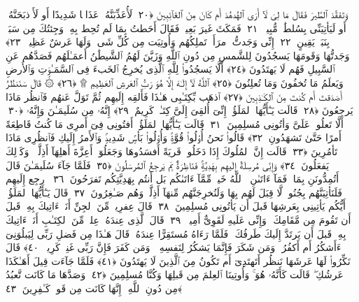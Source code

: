  وَتَفَقَّدَ ٱلطَّيرَ فَقَالَ مَا لِىَ لَآ أَرَى ٱلهُدهُدَ أَم كَانَ مِنَ ٱلغَآئِبِينَ ﴿٢٠﴾
 لَأُعَذِّبَنَّهُۥ عَذَابًۭا شَدِيدًا أَو لَأَا۟ذبَحَنَّهُۥٓ أَو لَيَأتِيَنِّى بِسُلطَٰنٍۢ مُّبِينٍۢ ﴿٢١﴾
 فَمَكَثَ غَيرَ بَعِيدٍۢ فَقَالَ أَحَطتُ بِمَا لَم تُحِط بِهِۦ وَجِئتُكَ مِن سَبَإٍۭ بِنَبَإٍۢ يَقِينٍ ﴿٢٢﴾
 إِنِّى وَجَدتُّ ٱمرَأَةًۭ تَملِكُهُم وَأُوتِيَت مِن كُلِّ شَىءٍۢ وَلَهَا عَرشٌ عَظِيمٌۭ ﴿٢٣﴾
 وَجَدتُّهَا وَقَومَهَا يَسجُدُونَ لِلشَّمسِ مِن دُونِ ٱللَّهِ وَزَيَّنَ لَهُمُ ٱلشَّيطَٰنُ أَعمَـٰلَهُم فَصَدَّهُم عَنِ ٱلسَّبِيلِ فَهُم لَا يَهتَدُونَ ﴿٢٤﴾
 أَلَّا يَسجُدُوا۟ لِلَّهِ ٱلَّذِى يُخرِجُ ٱلخَبءَ فِى ٱلسَّمَـٰوَٟتِ وَٱلأَرضِ وَيَعلَمُ مَا تُخفُونَ وَمَا تُعلِنُونَ ﴿٢٥﴾
 ٱللَّهُ لَآ إِلَـٰهَ إِلَّا هُوَ رَبُّ ٱلعَرشِ ٱلعَظِيمِ ۩ ﴿٢٦﴾
 ۞ قَالَ سَنَنظُرُ أَصَدَقتَ أَم كُنتَ مِنَ ٱلكَـٰذِبِينَ ﴿٢٧﴾
 ٱذهَب بِّكِتَـٰبِى هَـٰذَا فَأَلقِه إِلَيهِم ثُمَّ تَوَلَّ عَنهُم فَٱنظُر مَاذَا يَرجِعُونَ ﴿٢٨﴾
 قَالَت يَـٰٓأَيُّهَا ٱلمَلَؤُا۟ إِنِّىٓ أُلقِىَ إِلَىَّ كِتَـٰبٌۭ كَرِيمٌ ﴿٢٩﴾
 إِنَّهُۥ مِن سُلَيمَـٰنَ وَإِنَّهُۥ  ﴿٣٠﴾
 أَلَّا تَعلُوا۟ عَلَىَّ وَأتُونِى مُسلِمِينَ ﴿٣١﴾
 قَالَت يَـٰٓأَيُّهَا ٱلمَلَؤُا۟ أَفتُونِى فِىٓ أَمرِى مَا كُنتُ قَاطِعَةً أَمرًا حَتَّىٰ تَشهَدُونِ ﴿٣٢﴾
 قَالُوا۟ نَحنُ أُو۟لُوا۟ قُوَّةٍۢ وَأُو۟لُوا۟ بَأسٍۢ شَدِيدٍۢ وَٱلأَمرُ إِلَيكِ فَٱنظُرِى مَاذَا تَأمُرِينَ ﴿٣٣﴾
 قَالَت إِنَّ ٱلمُلُوكَ إِذَا دَخَلُوا۟ قَريَةً أَفسَدُوهَا وَجَعَلُوٓا۟ أَعِزَّةَ أَهلِهَآ أَذِلَّةًۭ ۖ وَكَذَٟلِكَ يَفعَلُونَ ﴿٣٤﴾
 وَإِنِّى مُرسِلَةٌ إِلَيهِم بِهَدِيَّةٍۢ فَنَاظِرَةٌۢ بِمَ يَرجِعُ ٱلمُرسَلُونَ ﴿٣٥﴾
 فَلَمَّا جَآءَ سُلَيمَـٰنَ قَالَ أَتُمِدُّونَنِ بِمَالٍۢ فَمَآ ءَاتَىٰنِۦَ ٱللَّهُ خَيرٌۭ مِّمَّآ ءَاتَىٰكُم بَل أَنتُم بِهَدِيَّتِكُم تَفرَحُونَ ﴿٣٦﴾
 ٱرجِع إِلَيهِم فَلَنَأتِيَنَّهُم بِجُنُودٍۢ لَّا قِبَلَ لَهُم بِهَا وَلَنُخرِجَنَّهُم مِّنهَآ أَذِلَّةًۭ وَهُم صَـٰغِرُونَ ﴿٣٧﴾
 قَالَ يَـٰٓأَيُّهَا ٱلمَلَؤُا۟ أَيُّكُم يَأتِينِى بِعَرشِهَا قَبلَ أَن يَأتُونِى مُسلِمِينَ ﴿٣٨﴾
 قَالَ عِفرِيتٌۭ مِّنَ ٱلجِنِّ أَنَا۠ ءَاتِيكَ بِهِۦ قَبلَ أَن تَقُومَ مِن مَّقَامِكَ ۖ وَإِنِّى عَلَيهِ لَقَوِىٌّ أَمِينٌۭ ﴿٣٩﴾
 قَالَ ٱلَّذِى عِندَهُۥ عِلمٌۭ مِّنَ ٱلكِتَـٰبِ أَنَا۠ ءَاتِيكَ بِهِۦ قَبلَ أَن يَرتَدَّ إِلَيكَ طَرفُكَ ۚ فَلَمَّا رَءَاهُ مُستَقِرًّا عِندَهُۥ قَالَ هَـٰذَا مِن فَضلِ رَبِّى لِيَبلُوَنِىٓ ءَأَشكُرُ أَم أَكفُرُ ۖ وَمَن شَكَرَ فَإِنَّمَا يَشكُرُ لِنَفسِهِۦ ۖ وَمَن كَفَرَ فَإِنَّ رَبِّى غَنِىٌّۭ كَرِيمٌۭ ﴿٤٠﴾
 قَالَ نَكِّرُوا۟ لَهَا عَرشَهَا نَنظُر أَتَهتَدِىٓ أَم تَكُونُ مِنَ ٱلَّذِينَ لَا يَهتَدُونَ ﴿٤١﴾
 فَلَمَّا جَآءَت قِيلَ أَهَـٰكَذَا عَرشُكِ ۖ قَالَت كَأَنَّهُۥ هُوَ ۚ وَأُوتِينَا ٱلعِلمَ مِن قَبلِهَا وَكُنَّا مُسلِمِينَ ﴿٤٢﴾
 وَصَدَّهَا مَا كَانَت تَّعبُدُ مِن دُونِ ٱللَّهِ ۖ إِنَّهَا كَانَت مِن قَومٍۢ كَـٰفِرِينَ ﴿٤٣﴾
